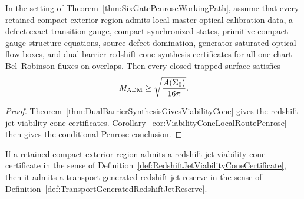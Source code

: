 \begin{corollary}\label{cor:DualBarrierLocalRoutePenrose}
In the setting of Theorem~\ref{thm:SixGatePenroseWorkingPath}, assume that every
retained compact exterior region admits local master optical calibration data, a
defect-exact transition gauge, compact synchronized states, primitive
compact-gauge structure equations, source-defect domination, generator-saturated
optical flow boxes, and dual-barrier redshift cone synthesis certificates for
all one-chart Bel--Robinson fluxes on overlaps. Then every closed trapped
surface satisfies
\[
    M_{\mathrm{ADM}}\ge \sqrt{\frac{A(\Sigma_0)}{16\pi}} .
\]
\end{corollary}

\begin{proof}
Theorem~\ref{thm:DualBarrierSynthesisGivesViabilityCone} gives the redshift jet
viability cone certificates.  Corollary~\ref{cor:ViabilityConeLocalRoutePenrose}
then gives the conditional Penrose conclusion.
\end{proof}

\begin{theorem}\label{thm:ViabilityConeProducesTransportedRedshiftReserve}
If a retained compact exterior region admits a redshift jet viability cone
certificate in the sense of
Definition~\ref{def:RedshiftJetViabilityConeCertificate}, then it admits a
transport-generated redshift jet reserve in the sense of
Definition~\ref{def:TransportGeneratedRedshiftJetReserve}.
\end{theorem}

